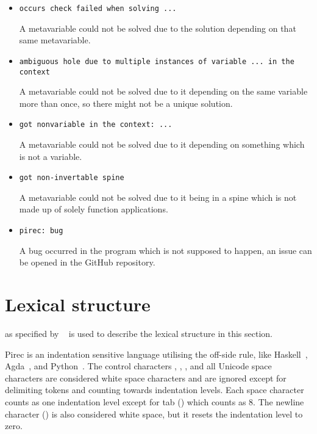 \begin{itemize}
  \item \begin{verbatim}
occurs check failed when solving ...
        \end{verbatim}
        A metavariable could not be solved due to the solution depending on that
        same metavariable.

  \item \begin{verbatim}
ambiguous hole due to multiple instances of variable ... in the context
        \end{verbatim}
        A metavariable could not be solved due to it depending on the same
        variable more than once, so there might not be a unique solution.

  \item \begin{verbatim}
got nonvariable in the context: ...
        \end{verbatim}
        A metavariable could not be solved due to it depending on something
        which is not a variable.

  \item \begin{verbatim}
got non-invertable spine
        \end{verbatim}
        A metavariable could not be solved due to it being in a spine which is
        not made up of solely function applications.

  \item \begin{verbatim}
pirec: bug
        \end{verbatim}
        A bug occurred in the program which is not supposed to happen, an issue
        can be opened in the GitHub repository.
\end{itemize}

\section{Lexical structure}\label{sec:lex}

 as specified by ~\cite{isoebnf} is used to describe the
lexical structure in this section.

Pirec is an indentation sensitive language utilising the off-side rule, like
Haskell~\cite{haskell2010}, Agda~\cite{agda}, and Python~\cite{python}. The
control characters , , ,
 and all Unicode space characters are considered white space
characters and are ignored except for delimiting tokens and counting towards
indentation levels. Each space character counts as one indentation level except
for tab () which counts as 8. The newline character
() is also considered white space, but it resets the indentation
level to zero.

